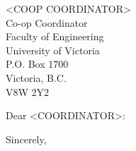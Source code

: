 \documentclass{letter}
\begin{document}
\begin{letter}{<COOP COORDINATOR> \\ Co-op Coordinator \\ Faculty of Engineering
\\ University of Victoria \\ P.O. Box 1700 \\ Victoria, B.C. \\ V8W 2Y2}
\opening{Dear <COORDINATOR>:}


\closing{Sincerely,}

\end{letter}
\end{document}
